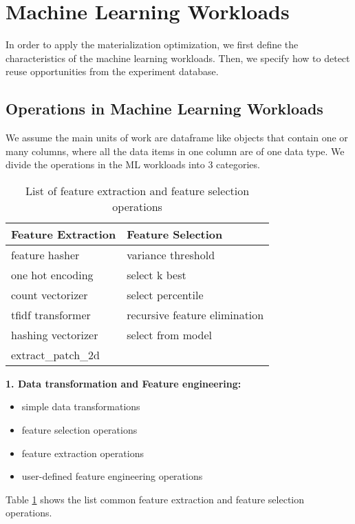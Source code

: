 \section{Machine Learning Workloads} \label{sec-ml-workloads}


In order to apply the materialization optimization, we first define the characteristics of the machine learning workloads.
Then, we specify how to detect reuse opportunities from the experiment database.

\subsection{Operations in Machine Learning Workloads}
We assume the main units of work are dataframe like objects that contain one or many columns, where all the data items in one column are of one data type.
We divide the operations in the ML workloads into 3 categories.
\begin{table}
\centering
\begin{tabular}{ll}
\hline
	   Feature Extraction & Feature Selection\\ \hline
        feature hasher & variance threshold  \\
        one hot encoding & select k best \\
        count vectorizer& select percentile \\ 
        tfidf transformer & recursive feature elimination \\
        hashing vectorizer & select from model \\
        extract\_patch\_2d &  \\
        \hline
\end{tabular}
\caption{List of feature extraction and feature selection operations}\label{feature-engineering-operations}
\end{table}

\textbf{1. Data transformation and Feature engineering:}
\begin{itemize}
\item simple data transformations
\item feature selection operations
\item feature extraction operations
\item user-defined feature engineering operations
\end{itemize}
Table \ref{feature-engineering-operations} shows the list common feature extraction and feature selection operations.

